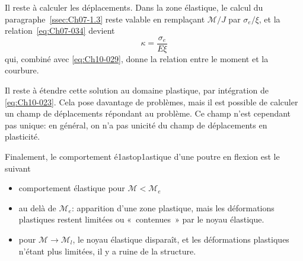 Il reste à calculer les déplacements.
Dans la zone élastique, le calcul du paragraphe~\ref{ssec:Ch07-1.3} reste valable en remplaçant $\mathcal{M}/J$ par $\sigma_e/\xi$, et la relation~\eqref{eq:Ch07-034} devient 
\begin{equation}
    \kappa = \frac{\sigma_e}{E \xi}
    \label{eq:Ch10-031}
\end{equation}
qui, combiné avec \eqref{eq:Ch10-029}, donne la relation entre le moment et la courbure. 

\begin{center}
\end{center}

Il reste à étendre cette solution au domaine plastique, par intégration de \eqref{eq:Ch10-023}.
Cela pose davantage de problèmes, mais il est possible de calculer un champ de déplacements répondant au problème.
Ce champ n'est cependant pas unique: en général, on n'a pas unicité du champ de déplacements en plasticité. 

Finalement, le comportement é1astop1astique d'une poutre en flexion est le suivant 
\begin{itemize}
    \item comportement élastique pour $\mathcal{M}<\mathcal{M}_e$
    \item au delà de $\mathcal{M}_e$: apparition d'une zone plastique, mais les déformations plastiques restent limitées ou «~contenues~» par le noyau élastique. 
    \item pour $\mathcal{M} \rightarrow \mathcal{M}_l$, le noyau élastique disparaît, et les déformations plastiques n'étant plus limitées, il y a ruine de la structure. 
\end{itemize}


